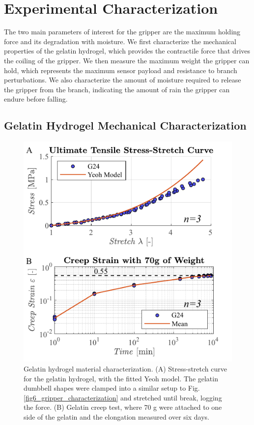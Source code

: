 \section{Experimental Characterization}
The two main parameters of interest for the gripper are the maximum holding force and its degradation with moisture. We first characterize the mechanical properties of the gelatin hydrogel, which provides the contractile force that drives the coiling of the gripper. We then measure the maximum weight the gripper can hold, which represents the maximum sensor payload and resistance to branch perturbations. We also characterize the amount of moisture required to release the gripper from the branch, indicating the amount of rain the gripper can endure before falling. %

\subsection{Gelatin Hydrogel Mechanical Characterization}

\begin{figure}[!t]
\centering
\includegraphics[width=1\columnwidth]{chapters/papers/BOG/figures/figure4-gelatin_charac/figure4-gelatin-charac.pdf}%
\caption{Gelatin hydrogel material characterization. (A) Stress-stretch curve for the gelatin hydrogel, with the fitted Yeoh model. The gelatin dumbbell shapes were clamped into a similar setup to Fig. \ref{fig6_gripper_characterization} and stretched until break, logging the force. (B) Gelatin creep test, where 70 g were attached to one side of the gelatin and the elongation measured over six days.}
\label{fig4_gelatin_charac}
\end{figure}

